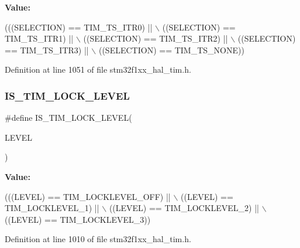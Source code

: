 {\bfseries Value\+:}
\begin{DoxyCode}
(((SELECTION) == TIM\_TS\_ITR0) || \(\backslash\)
                                                           ((SELECTION) == TIM\_TS\_ITR1) || \(\backslash\)
                                                           ((SELECTION) == TIM\_TS\_ITR2) || \(\backslash\)
                                                           ((SELECTION) == TIM\_TS\_ITR3) || \(\backslash\)
                                                           ((SELECTION) == TIM\_TS\_NONE))
\end{DoxyCode}


Definition at line 1051 of file stm32f1xx\+\_\+hal\+\_\+tim.\+h.

\mbox{\label{group___t_i_m___private___macros_gacf5e70717f6d13af301331bb043f5d48}} 
\subsubsection{\texorpdfstring{I\+S\+\_\+\+T\+I\+M\+\_\+\+L\+O\+C\+K\+\_\+\+L\+E\+V\+EL}{IS\_TIM\_LOCK\_LEVEL}}
{\footnotesize\ttfamily \#define I\+S\+\_\+\+T\+I\+M\+\_\+\+L\+O\+C\+K\+\_\+\+L\+E\+V\+EL(\begin{DoxyParamCaption}\item[{}]{L\+E\+V\+EL }\end{DoxyParamCaption})}

{\bfseries Value\+:}
\begin{DoxyCode}
(((LEVEL) == TIM\_LOCKLEVEL\_OFF) || \(\backslash\)
                                  ((LEVEL) == TIM\_LOCKLEVEL\_1)   || \(\backslash\)
                                  ((LEVEL) == TIM\_LOCKLEVEL\_2)   || \(\backslash\)
                                  ((LEVEL) == TIM\_LOCKLEVEL\_3))
\end{DoxyCode}


Definition at line 1010 of file stm32f1xx\+\_\+hal\+\_\+tim.\+h.

\mbox{\label{group___t_i_m___private___macros_ga53146701cf287a0eca43b9232dffac60}} 
